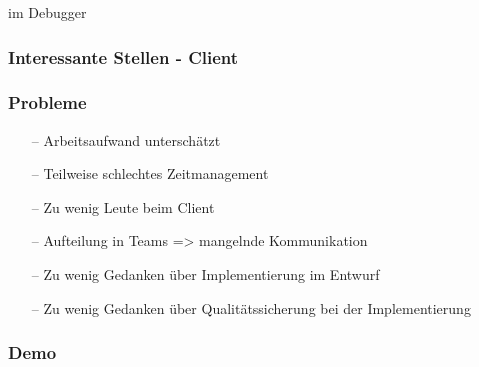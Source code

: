 \documentclass[aspectratio=1610]{beamer}
\begin{document}
\begin{frame}[plain]
{{            im Debugger}\\
        }

    \end{frame}

  \begin{frame}[plain]
      \frametitle{\textbf{Interessante Stellen - Client}}
  \end{frame}

  \begin{frame}[plain]
      \frametitle{\textbf{Probleme}}
      \begin{itemize}
        \item[--] Arbeitsaufwand unterschätzt
        \item[--] Teilweise schlechtes Zeitmanagement
        \item[--] Zu wenig Leute beim Client
        \item[--] Aufteilung in Teams => mangelnde Kommunikation
        \item[--] Zu wenig Gedanken über Implementierung im Entwurf
        \item[--] Zu wenig Gedanken über Qualitätssicherung bei der Implementierung
      \end{itemize}
  \end{frame}


  \begin{frame}[plain]
      \frametitle{\textbf{Demo}}

  \end{frame}
\end{document}
